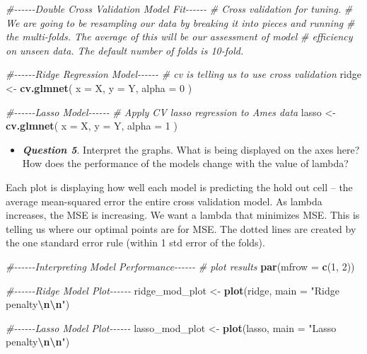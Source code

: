 \documentclass[
]{article}
\newenvironment{Shaded}{\begin{snugshade}}{\end{snugshade}}
\newcommand{\AttributeTok}[1]{\textcolor[rgb]{0.13,0.29,0.53}{#1}}
\newcommand{\CommentTok}[1]{\textcolor[rgb]{0.56,0.35,0.01}{\textit{#1}}}
\newcommand{\DecValTok}[1]{\textcolor[rgb]{0.00,0.00,0.81}{#1}}
\newcommand{\FunctionTok}[1]{\textcolor[rgb]{0.13,0.29,0.53}{\textbf{#1}}}
\newcommand{\NormalTok}[1]{#1}
\newcommand{\OtherTok}[1]{\textcolor[rgb]{0.56,0.35,0.01}{#1}}
\newcommand{\SpecialCharTok}[1]{\textcolor[rgb]{0.81,0.36,0.00}{\textbf{#1}}}
\newcommand{\StringTok}[1]{\textcolor[rgb]{0.31,0.60,0.02}{#1}}
\providecommand{\tightlist}{%
  \setlength{\itemsep}{0pt}\setlength{\parskip}{0pt}}
\begin{document}
\begin{Shaded}
\begin{Highlighting}[]
\CommentTok{\#{-}{-}{-}{-}{-}{-}Double Cross Validation Model Fit{-}{-}{-}{-}{-}{-}}
\CommentTok{\# Cross validation for tuning. }
\CommentTok{\# We are going to be resampling our data by breaking it into pieces and running }
\CommentTok{\# the multi{-}folds. The average of this will be our assessment of model }
\CommentTok{\# efficiency on unseen data. The default number of folds is 10{-}fold.}

\CommentTok{\#{-}{-}{-}{-}{-}{-}Ridge Regression Model{-}{-}{-}{-}{-}{-}}
\CommentTok{\# cv is telling us to use cross validation}
\NormalTok{ridge }\OtherTok{\textless{}{-}} \FunctionTok{cv.glmnet}\NormalTok{(}
  \AttributeTok{x =}\NormalTok{ X,}
  \AttributeTok{y =}\NormalTok{ Y,}
  \AttributeTok{alpha =} \DecValTok{0}
\NormalTok{)}


\CommentTok{\#{-}{-}{-}{-}{-}{-}Lasso Model{-}{-}{-}{-}{-}{-}}
\CommentTok{\# Apply CV lasso regression to Ames data}
\NormalTok{lasso }\OtherTok{\textless{}{-}} \FunctionTok{cv.glmnet}\NormalTok{(}
  \AttributeTok{x =}\NormalTok{ X,}
  \AttributeTok{y =}\NormalTok{ Y,}
  \AttributeTok{alpha =} \DecValTok{1}
\NormalTok{)}
\end{Highlighting}
\end{Shaded}

\begin{itemize}
\tightlist
\item
  \textbf{\emph{Question 5}}. Interpret the graphs. What is being
  displayed on the axes here? How does the performance of the models
  change with the value of lambda?
\end{itemize}

Each plot is displaying how well each model is predicting the hold out
cell -- the average mean-squared error the entire cross validation
model. As lambda increases, the MSE is increasing. We want a lambda that
minimizes MSE. This is telling us where our optimal points are for MSE.
The dotted lines are created by the one standard error rule (within 1
std error of the folds).

\begin{Shaded}
\begin{Highlighting}[]
\CommentTok{\#{-}{-}{-}{-}{-}{-}Interpreting Model Performance{-}{-}{-}{-}{-}{-}}
\CommentTok{\# plot results}
\FunctionTok{par}\NormalTok{(}\AttributeTok{mfrow =} \FunctionTok{c}\NormalTok{(}\DecValTok{1}\NormalTok{, }\DecValTok{2}\NormalTok{))}

\CommentTok{\#{-}{-}{-}{-}{-}{-}Ridge Model Plot{-}{-}{-}{-}{-}{-}}
\NormalTok{ridge\_mod\_plot }\OtherTok{\textless{}{-}} \FunctionTok{plot}\NormalTok{(ridge, }\AttributeTok{main =} \StringTok{"Ridge penalty}\SpecialCharTok{\textbackslash{}n\textbackslash{}n}\StringTok{"}\NormalTok{)}

\CommentTok{\#{-}{-}{-}{-}{-}{-}Lasso Model Plot{-}{-}{-}{-}{-}{-}}
\NormalTok{lasso\_mod\_plot }\OtherTok{\textless{}{-}} \FunctionTok{plot}\NormalTok{(lasso, }\AttributeTok{main =} \StringTok{"Lasso penalty}\SpecialCharTok{\textbackslash{}n\textbackslash{}n}\StringTok{"}\NormalTok{)}
\end{Highlighting}
\end{Shaded}
\end{document}
